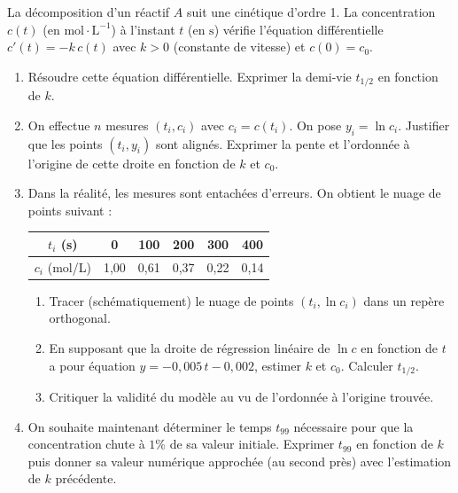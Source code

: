 \documentclass[11pt]{article}
\begin{document}
\begin{exercice}
La décomposition d'un réactif $A$ suit une cinétique d'ordre 1. La concentration $c(t)$ (en $\text{mol}\cdot\text{L}^{-1}$) à l'instant $t$ (en $\text{s}$) vérifie l'équation différentielle $c'(t) = -k\,c(t)$ avec $k>0$ (constante de vitesse) et $c(0)=c_0$.
\begin{enumerate}
    \item Résoudre cette équation différentielle. Exprimer la demi-vie $t_{1/2}$ en fonction de $k$.
    \item On effectue $n$ mesures $(t_i, c_i)$ avec $c_i = c(t_i)$. On pose $y_i = \ln c_i$. Justifier que les points $(t_i, y_i)$ sont alignés. Exprimer la pente et l'ordonnée à l'origine de cette droite en fonction de $k$ et $c_0$.
    \item Dans la réalité, les mesures sont entachées d'erreurs. On obtient le nuage de points suivant :
    \begin{center}
    \begin{tabular}{|c|c|c|c|c|c|}
    \hline $t_i$ (s) & 0 & 100 & 200 & 300 & 400 \\ \hline
    $c_i$ (mol/L) & 1,00 & 0,61 & 0,37 & 0,22 & 0,14 \\ \hline
    \end{tabular}
    \end{center}
    \begin{enumerate}
        \item Tracer (schématiquement) le nuage de points $(t_i, \ln c_i)$ dans un repère orthogonal.
        \item En supposant que la droite de régression linéaire de $\ln c$ en fonction de $t$ a pour équation $y = -0,005\,t - 0,002$, estimer $k$ et $c_0$. Calculer $t_{1/2}$.
        \item Critiquer la validité du modèle au vu de l'ordonnée à l'origine trouvée.
    \end{enumerate}
    \item On souhaite maintenant déterminer le temps $t_{99}$ nécessaire pour que la concentration chute à $1\%$ de sa valeur initiale. Exprimer $t_{99}$ en fonction de $k$ puis donner sa valeur numérique approchée (au second près) avec l'estimation de $k$ précédente.
\end{enumerate}
\end{exercice}
\end{document}
